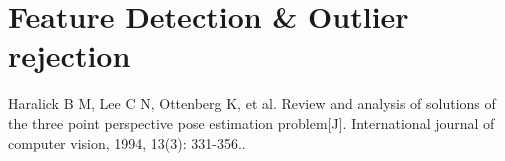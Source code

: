 \documentclass[aspectratio=169, compress]{beamer}
\begin{document}
\section{Feature Detection \& Outlier rejection}

	
	
	\begin{thebibliography}{00}
	 Haralick B M, Lee C N, Ottenberg K, et al. Review and analysis of solutions of the three point perspective pose estimation problem[J]. International journal of computer vision, 1994, 13(3): 331-356..
	\end{thebibliography}	
	
\end{document}
